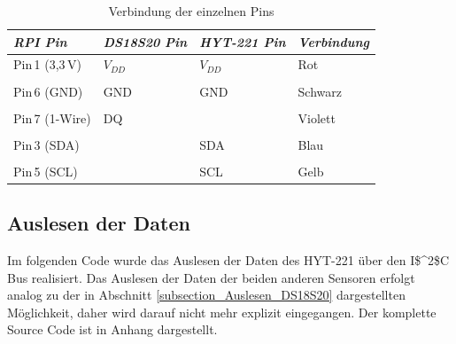 \begin{table}[H]
\centering
\begin{tabular}{
llll
}
\toprule

\multicolumn{1}{p{3cm}}{\textit{\ac{RPI}\;3 Pin}} & \multicolumn{1}{p{3cm}}{\textit{DS18S20 Pin} }&\multicolumn{1}{p{3cm}}{\textit{HYT-221 Pin}}&\multicolumn{1}{p{3cm}}{\textit{Verbindung}}\\\midrule
Pin\,1 (3,3\,V) & $V_{DD}$&$V_{DD}$ & Rot\\
&&&\\
Pin\,6 (GND) & GND&GND & Schwarz\\
&&&\\
Pin\,7 (1-Wire) & DQ& & Violett\\
&&&\\
Pin\,3 (SDA) & & SDA&Blau\\
&&&\\
Pin\,5 (SCL)&& SCL& Gelb\\ 
\bottomrule
\end{tabular}
\caption{Verbindung der einzelnen Pins}
\label{Tabelle_Elektrische_Daten_DS18S20}
\end{table}

\subsection{Auslesen der Daten}
\label{subsection_Auslesen der Daten HYT221}
Im folgenden Code wurde das Auslesen der Daten des HYT-221 über den \ac{I$^2$C} Bus realisiert. Das Auslesen der Daten der beiden anderen Sensoren erfolgt analog zu der in Abschnitt \ref{subsection_Auslesen_DS18S20} dargestellten Möglichkeit, daher wird darauf nicht mehr explizit eingegangen. Der komplette Source Code ist in Anhang dargestellt.



